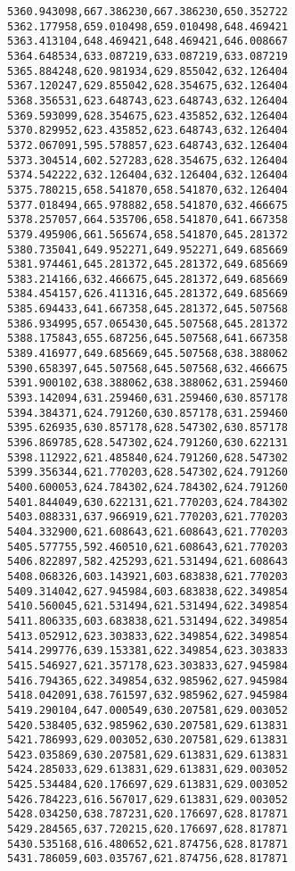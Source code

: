 \documentclass[11pt]{article}
\begin{document}
\begin{Verbatim}[commandchars=\\\{\}]
5360.943098,667.386230,667.386230,650.352722
5362.177958,659.010498,659.010498,648.469421
5363.413104,648.469421,648.469421,646.008667
5364.648534,633.087219,633.087219,633.087219
5365.884248,620.981934,629.855042,632.126404
5367.120247,629.855042,628.354675,632.126404
5368.356531,623.648743,623.648743,632.126404
5369.593099,628.354675,623.435852,632.126404
5370.829952,623.435852,623.648743,632.126404
5372.067091,595.578857,623.648743,632.126404
5373.304514,602.527283,628.354675,632.126404
5374.542222,632.126404,632.126404,632.126404
5375.780215,658.541870,658.541870,632.126404
5377.018494,665.978882,658.541870,632.466675
5378.257057,664.535706,658.541870,641.667358
5379.495906,661.565674,658.541870,645.281372
5380.735041,649.952271,649.952271,649.685669
5381.974461,645.281372,645.281372,649.685669
5383.214166,632.466675,645.281372,649.685669
5384.454157,626.411316,645.281372,649.685669
5385.694433,641.667358,645.281372,645.507568
5386.934995,657.065430,645.507568,645.281372
5388.175843,655.687256,645.507568,641.667358
5389.416977,649.685669,645.507568,638.388062
5390.658397,645.507568,645.507568,632.466675
5391.900102,638.388062,638.388062,631.259460
5393.142094,631.259460,631.259460,630.857178
5394.384371,624.791260,630.857178,631.259460
5395.626935,630.857178,628.547302,630.857178
5396.869785,628.547302,624.791260,630.622131
5398.112922,621.485840,624.791260,628.547302
5399.356344,621.770203,628.547302,624.791260
5400.600053,624.784302,624.784302,624.791260
5401.844049,630.622131,621.770203,624.784302
5403.088331,637.966919,621.770203,621.770203
5404.332900,621.608643,621.608643,621.770203
5405.577755,592.460510,621.608643,621.770203
5406.822897,582.425293,621.531494,621.608643
5408.068326,603.143921,603.683838,621.770203
5409.314042,627.945984,603.683838,622.349854
5410.560045,621.531494,621.531494,622.349854
5411.806335,603.683838,621.531494,622.349854
5413.052912,623.303833,622.349854,622.349854
5414.299776,639.153381,622.349854,623.303833
5415.546927,621.357178,623.303833,627.945984
5416.794365,622.349854,632.985962,627.945984
5418.042091,638.761597,632.985962,627.945984
5419.290104,647.000549,630.207581,629.003052
5420.538405,632.985962,630.207581,629.613831
5421.786993,629.003052,630.207581,629.613831
5423.035869,630.207581,629.613831,629.613831
5424.285033,629.613831,629.613831,629.003052
5425.534484,620.176697,629.613831,629.003052
5426.784223,616.567017,629.613831,629.003052
5428.034250,638.787231,620.176697,628.817871
5429.284565,637.720215,620.176697,628.817871
5430.535168,616.480652,621.874756,628.817871
5431.786059,603.035767,621.874756,628.817871

\end{Verbatim}
\end{document}
